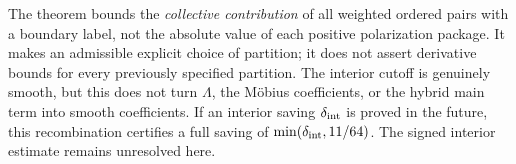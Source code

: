 The theorem bounds the \emph{collective contribution} of all weighted ordered pairs with a boundary label, not the absolute value of each positive polarization package.
It makes an admissible explicit choice of partition; it does not assert derivative bounds for every previously specified partition.
The interior cutoff is genuinely smooth, but this does not turn $\Lambda$, the M\"obius coefficients, or the hybrid main term into smooth coefficients.
If an interior saving $\delta_{\rm int}$ is proved in the future, this recombination certifies a full saving of $\min(\delta_{\rm int},11/64)$. The signed interior estimate remains unresolved here.
